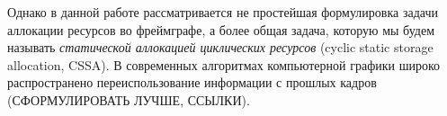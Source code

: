 Однако в данной работе рассматривается не простейшая формулировка задачи аллокации ресурсов во фреймграфе, а более общая задача, которую мы будем называть \textit{статической аллокацией циклических ресурсов} (cyclic static storage allocation, CSSA). В современных алгоритмах компьютерной графики широко распространено переиспользование информации с прошлых кадров (СФОРМУЛИРОВАТЬ ЛУЧШЕ, ССЫЛКИ).

